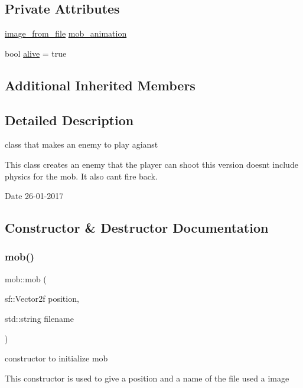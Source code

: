 \subsection*{Private Attributes}
\begin{DoxyCompactItemize}
\item 
\hyperlink{classimage__from__file}{image\+\_\+from\+\_\+file} \hyperlink{classmob_a28d29e0a52a7094c995df09dcdcf0d3e}{mob\+\_\+animation}
\item 
bool \hyperlink{classmob_aae8e9788785c59d1f4c81c8e0d0e5227}{alive} = true
\end{DoxyCompactItemize}
\subsection*{Additional Inherited Members}


\subsection{Detailed Description}
class that makes an enemy to play agianst 

This class creates an enemy that the player can shoot this version doesn\textquotesingle{}t include physics for the mob. It also can\textquotesingle{}t fire back.

\begin{DoxyDate}{Date}
26-\/01-\/2017 
\end{DoxyDate}


\subsection{Constructor \& Destructor Documentation}
\mbox{\label{classmob_ac524dd40986df00721239b66c552437e}} 
\subsubsection{\texorpdfstring{mob()}{mob()}}
{\footnotesize\ttfamily mob\+::mob (\begin{DoxyParamCaption}\item[{sf\+::\+Vector2f}]{position,  }\item[{std\+::string}]{filename }\end{DoxyParamCaption})}



constructor to initialize mob 

This constructor is used to give a position and a name of the file used a image


